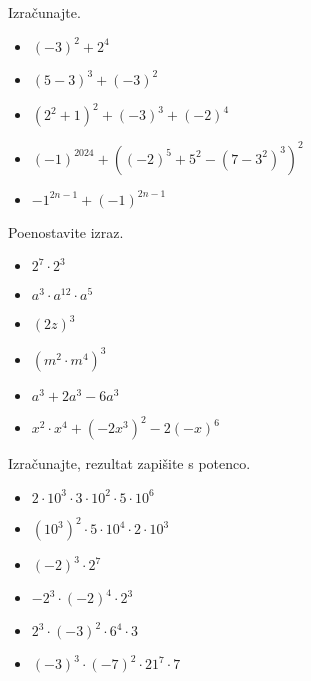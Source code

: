                 \begin{naloga}
                    Izračunajte.
                    \begin{itemize}
                        \item $(-3)^2+2^4$ 
                        \item $(5-3)^3+(-3)^2$ 
                        \item $(2^2+1)^2+(-3)^3+(-2)^4$ 
                        \item $(-1)^{2024}+((-2)^5+5^2-(7-3^2)^3)^2$ 
                        \item $-1^{2n-1}+(-1)^{2n-1}$ 
                    \end{itemize}
                \end{naloga}

                \begin{naloga}
                        Poenostavite izraz.
                    \begin{itemize}
                        \item $2^7\cdot 2^3$ 
                        \item $a^3\cdot a^{12}\cdot a^5$ 
                        \item $(2z)^3$ 
                        \item $(m^2\cdot m^4)^3$ 
                        \item $a^3+2a^3-6a^3$ 
                        \item $x^2\cdot x^4+(-2x^3)^2-2(-x)^6$ 
                    \end{itemize}
                \end{naloga}

                
        \begin{naloga}
            Izračunajte, rezultat zapišite s potenco.
            \begin{itemize}
                \item $2\cdot 10^3\cdot 3\cdot 10^2\cdot 5\cdot 10^6$ 
                \item $(10^3)^2\cdot5\cdot 10^4\cdot 2\cdot 10^3$ 
                \item $(-2)^3\cdot 2^7$ 
                \item $-2^3\cdot (-2)^4\cdot 2^3$ 
                \item $2^3\cdot(-3)^2\cdot 6^4\cdot 3$ 
                \item $(-3)^3\cdot(-7)^2\cdot 21^7\cdot 7$ 
            \end{itemize}
        \end{naloga}

